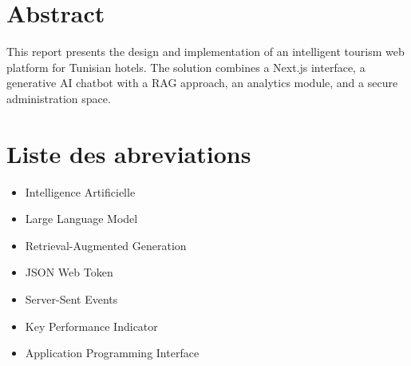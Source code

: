 \documentclass[12pt,a4paper,oneside]{report}
\begin{document}
\chapter*{Abstract}
This report presents the design and implementation of an intelligent tourism web platform for Tunisian hotels. The solution combines a Next.js interface, a generative AI chatbot with a RAG approach, an analytics module, and a secure administration space.

\chapter*{Liste des abreviations}
\begin{itemize}[leftmargin=2cm]
  \item[IA] Intelligence Artificielle
  \item[LLM] Large Language Model
  \item[RAG] Retrieval-Augmented Generation
  \item[JWT] JSON Web Token
  \item[SSE] Server-Sent Events
  \item[KPI] Key Performance Indicator
  \item[API] Application Programming Interface
\end{itemize}

\tableofcontents
\listoffigures
\listoftables

\clearpage
{}












\end{document}
